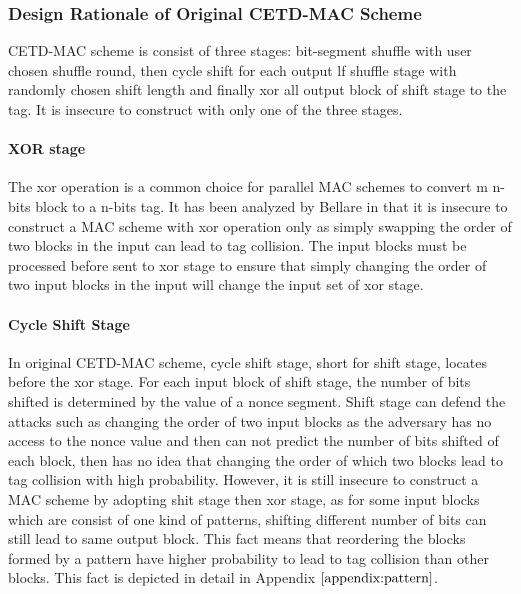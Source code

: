 \subsubsection{Design Rationale of Original CETD-MAC Scheme}
CETD-MAC scheme is consist of three stages: bit-segment shuffle with user chosen shuffle round, then cycle shift for each output lf shuffle stage with randomly chosen shift length and finally xor all output block of shift stage to the tag. It is insecure to construct with only one of the three stages.
\paragraph{XOR stage}
The xor operation is a common choice for parallel MAC schemes to convert m n-bits block to a n-bits tag. It has been analyzed by Bellare in \cite{} that it is insecure to construct a MAC scheme with xor operation only as simply swapping the order of two blocks in the input can lead to tag collision.  The input blocks must be processed before sent to xor stage to ensure that simply changing the order of two input blocks in the input will change the input set of xor stage.
\paragraph{Cycle Shift Stage}
In original CETD-MAC scheme, cycle shift stage, short for shift stage, locates before the xor stage. For each input block of shift stage, the number of bits shifted is determined by the value of a nonce segment. Shift stage can defend the attacks such as changing the order of two input blocks as the adversary has no access to the nonce value and then can not predict the number of bits shifted of each block, then has no idea that changing the order of which two blocks lead to tag collision with high probability. However, it is still insecure to construct a MAC scheme by adopting shit stage then xor stage, as for some input blocks which are consist of one kind of patterns, shifting different number of bits can still lead to same output block. This fact means that reordering the blocks formed by a pattern have higher probability to lead to tag collision than other blocks. This fact is depicted in detail in Appendix $\ref{appendix:pattern}$. 

